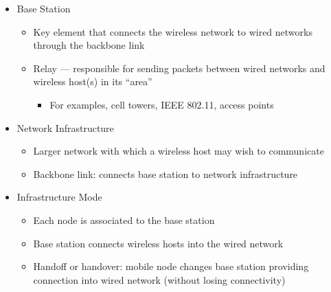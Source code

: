 \begin{itemize}
\begin{itemize}
\begin{itemize}
        \end{itemize}

    \end{itemize}

  \item Base Station

    \begin{itemize}

      \item Key element that connects the wireless network to wired networks through the backbone link

      \item Relay — responsible for sending packets between wired networks and wireless host(s) in its ``area''

        \begin{itemize}

          \item For examples, cell towers, IEEE 802.11, access points

        \end{itemize}

    \end{itemize}

  \item Network Infrastructure

    \begin{itemize}

      \item Larger network with which a wireless host may wish to communicate

      \item Backbone link: connects base station to network infrastructure

    \end{itemize}

  \item Infrastructure Mode

    \begin{itemize}

      \item Each node is associated to the base station

      \item Base station connects wireless hosts into the wired network

      \item Handoff or handover: mobile node changes base station providing connection into wired network (without losing connectivity)

    \end{itemize}


\end{itemize}
